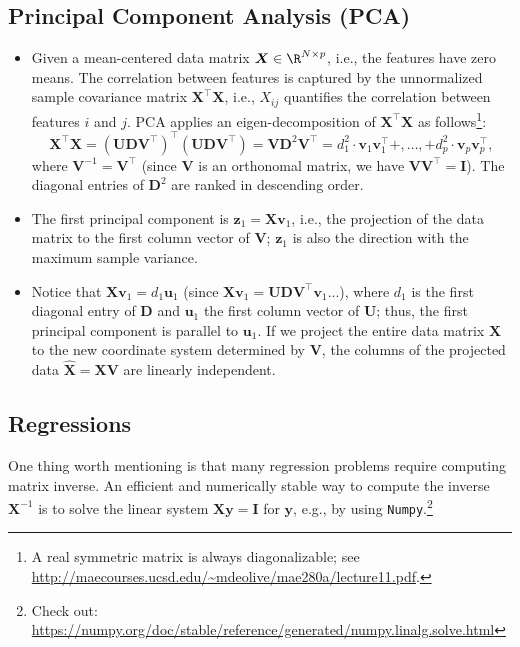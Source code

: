 \subsection{Principal Component Analysis (PCA)}
    \begin{itemize}
        \item Given a mean-centered data matrix $\bm{X} \in \R^{\ndata \times \nfeat}$, i.e., the features have zero means.
        The correlation between features is captured by the unnormalized sample covariance matrix $\bm{X}^\top \bm{X}$, i.e., $X_{ij}$ quantifies the correlation between features $i$ and $j$.
        PCA applies an eigen-decomposition of $\bm{X}^\top \bm{X}$ as follows\footnote{A real symmetric matrix is always diagonalizable; see \url{http://maecourses.ucsd.edu/~mdeolive/mae280a/lecture11.pdf}.}:
            \begin{equation}
                \bm{X}^\top \bm{X} = \left( \bm{U}\bm{D}\bm{V}^\top \right)^\top \left( \bm{U}\bm{D}\bm{V}^\top \right) = \bm{V} \bm{D}^2 \bm{V}^\top = d_1^2 \cdot \bm{v}_1 \bm{v}_1^\top +, \ldots, +  d_p^2 \cdot \bm{v}_p \bm{v}_p^\top,
            \end{equation}
        where $\bm{V}^{-1} = \bm{V}^\top$ (since $\bm{V}$ is an orthonomal matrix, we have $\bm{V} \bm{V}^\top = \bm{I}$). 
        The diagonal entries of $\bm{D}^2$ are ranked in descending order.
        \item The first principal component is $\bm{z}_1 = \bm{X} \bm{v}_1$, i.e., the projection of the data matrix to the first column vector of $\bm{V}$; $\bm{z}_1$ is also the direction with the maximum sample variance.
        
        \item Notice that $\bm{X} \bm{v}_1 = d_1 \bm{u}_1$ (since $\bm{X} \bm{v}_1 = \bm{U} \bm{D} \bm{V}^\top \bm{v}_1$...), where $d_1$ is the first diagonal entry of $\bm{D}$ and $\bm{u}_1$ the first column vector of $\bm{U}$; thus, the first principal component is parallel to $\bm{u}_1$.
        If we project the entire data matrix $\bm{X}$ to the new coordinate system determined by $\bm{V}$, the columns of the projected data $\hat{\bm{X}} = \bm{X} \bm{V}$ are linearly independent.
    \end{itemize}


\subsection{Regressions}
    One thing worth mentioning is that many regression problems require computing matrix inverse.
    An efficient and numerically stable way to compute the inverse $\bm{X}^{-1}$ is to solve the linear system $\bm{X} \bm{y} = \bm{I}$ for $\bm{y}$, e.g., by using \texttt{Numpy}.\footnote{Check out: \url{https://numpy.org/doc/stable/reference/generated/numpy.linalg.solve.html}}
    
